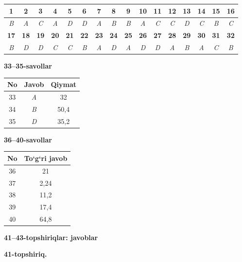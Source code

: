 \documentclass[11pt,a4paper]{article}
\begin{document}
\noindent\begin{tabular}{|c|c|c|c|c|c|c|c|c|c|c|c|c|c|c|c|}\hline
\textbf{1} & \textbf{2} & \textbf{3} & \textbf{4} & \textbf{5} & \textbf{6} & \textbf{7} & \textbf{8} & \textbf{9} & \textbf{10} & \textbf{11} & \textbf{12} & \textbf{13} & \textbf{14} & \textbf{15} & \textbf{16}\\\hline
\textsl{B} & \textsl{A} & \textsl{C} & \textsl{A} & \textsl{D} & \textsl{D} & \textsl{A} & \textsl{B} & \textsl{B} & \textsl{A} & \textsl{C} & \textsl{C} & \textsl{D} & \textsl{C} & \textsl{B} & \textsl{C}\\\hline
\textbf{17} & \textbf{18} & \textbf{19} & \textbf{20} & \textbf{21} & \textbf{22} & \textbf{23} & \textbf{24} & \textbf{25} & \textbf{26} & \textbf{27} & \textbf{28} & \textbf{29} & \textbf{30} & \textbf{31} & \textbf{32}\\\hline
\textsl{B} & \textsl{D} & \textsl{D} & \textsl{C} & \textsl{C} & \textsl{B} & \textsl{A} & \textsl{D} & \textsl{A} & \textsl{D} & \textsl{D} & \textsl{A} & \textsl{B} & \textsl{A} & \textsl{C} & \textsl{B}\\\hline
\end{tabular}\par\medskip
\noindent\textbf{33--35-savollar}\par\smallskip
\noindent\begin{tabular}{|c|c|c|}\hline \textbf{No} & \textbf{Javob} & \textbf{Qiymat}\\\hline
33 & \textsl{A} & 32\\\hline
34 & \textsl{B} & 50,4\\\hline
35 & \textsl{D} & 35,2\\\hline
\end{tabular}\par\medskip
\noindent\textbf{36--40-savollar}\par\smallskip
\noindent\begin{tabular}{|c|c|}\hline \textbf{No} & \textbf{To`g`ri javob}\\\hline
36 & 21\\\hline
37 & 2,24\\\hline
38 & 11,2\\\hline
39 & 17,4\\\hline
40 & 64,8\\\hline
\end{tabular}\par\medskip
\noindent\textbf{41--43-topshiriqlar: javoblar}\par\smallskip
\noindent\textbf{41-topshiriq.}\par
\end{document}
